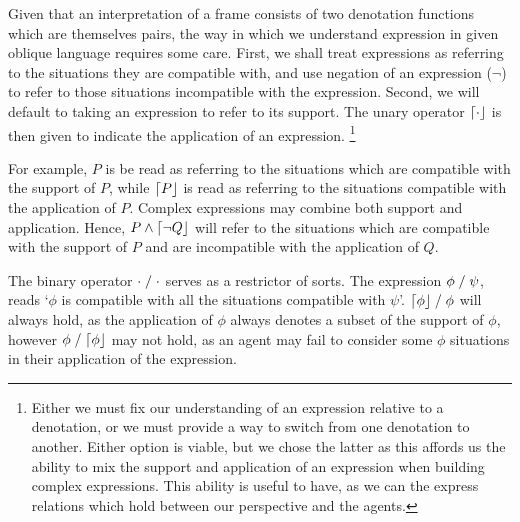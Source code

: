 \documentclass[10pt]{article}
\begin{document}
Given that an interpretation of a frame consists of two denotation functions which are themselves pairs, the way in which we understand expression in given oblique language requires some care.
First, we shall treat expressions as referring to the situations they are compatible with, and use negation of an expression (\(\lnot\)) to refer to those situations incompatible with the expression.
Second, we will default to taking an expression to refer to its support.
The unary operator \(\mathord{\lceil{\cdot}\rfloor}\) is then given to indicate the application of an expression.\nolinebreak
\footnote{Either we must fix our understanding of an expression relative to a denotation, or we must provide a way to switch from one denotation to another.
  Either option is viable, but we chose the latter as this affords us the ability to mix the support and application of an expression when building complex expressions.
This ability is useful to have, as we can the express relations which hold between our perspective and the agents.}

For example, \(P\) is be read as referring to the situations which are compatible with the support of \(P\), while \(\mathord{\lceil{P}\rfloor}\) is read as referring to the situations compatible with the application of \(P\).
Complex expressions may combine both support and application.
Hence, \(P \land \mathord{\lceil{\lnot Q}\rfloor}\) will refer to the situations which are compatible with the support of \(P\) and are incompatible with the application of \(Q\).

The binary operator \(\cdot \mathrel{ / } \cdot\) serves as a restrictor of sorts.
The expression \(\phi \mathrel{ / } \psi\), reads `\(\phi\) is compatible with all the situations compatible with \(\psi\)'.
\(\mathord{\lceil{\phi}\rfloor} \mathrel{ / } \phi\) will always hold, as the application of \(\phi\) always denotes a subset of the support of \(\phi\), however \(\phi \mathrel{ / } \mathord{\lceil{\phi}\rfloor}\) may not hold, as an agent may fail to consider some \(\phi\) situations in their application of the expression.
\end{document}
